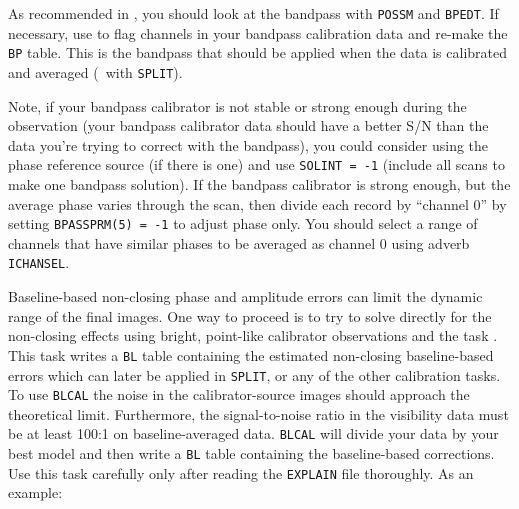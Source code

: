 As recommended in , you should look at the bandpass with
{\tt POSSM} and {\tt BPEDT}\@.  If necessary, use {\tt {}}
to flag channels in your bandpass calibration data and re-make the
{\tt BP} table.  This is the bandpass that should be applied when the
data is calibrated and averaged (\eg\ with {\tt SPLIT}).

Note, if your bandpass calibrator is not stable or strong enough
during the observation (your bandpass calibrator data should have
a better S/N than the data you're trying to correct with the
bandpass), you could consider using the phase reference source (if
there is one) and use {\tt SOLINT = -1} (include all scans to make one
bandpass solution).  If the bandpass calibrator is strong enough, but
the average phase varies through the scan, then divide each record by
``channel 0'' by setting {\tt BPASSPRM(5) = -1} to adjust phase only.
You should select a range of channels that have similar phases to be
averaged as channel 0 using adverb {\tt ICHANSEL}\@.


Baseline-based non-closing phase and amplitude errors can limit the
dynamic range of the final images.  One way to proceed is to try to
solve directly for the non-closing effects using bright, point-like
calibrator observations and the task {\tt {}}\@.  This
task writes a {\tt BL} table containing the estimated non-closing
baseline-based errors which can later be applied in {\tt SPLIT}, or
any of the other calibration tasks.  To use {\tt BLCAL} the noise in
the calibrator-source images should approach the theoretical limit.
Furthermore, the signal-to-noise ratio in the visibility data must be
at least 100:1 on baseline-averaged data.  {\tt BLCAL} will divide
your data by your best model and then write a {\tt BL} table
containing the baseline-based corrections.  Use this task carefully
only after reading the {\tt EXPLAIN} file thoroughly.  As an example:

